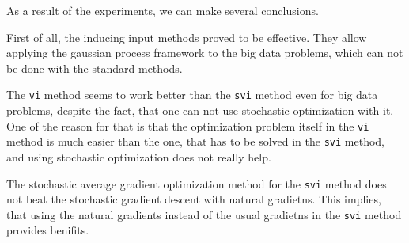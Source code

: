 As a result of the experiments, we can make several conclusions.

First of all, the inducing input methods proved to be effective. They allow applying the gaussian process framework to the big data problems, which can not be done with the standard methods. 

The \lstinline{vi} method seems to work better than the \lstinline{svi} method even for big data problems, despite the fact, that one can not use stochastic optimization with it. One of the reason for that is that the optimization problem itself in the \lstinline{vi} method is much easier than the one, that has to be solved in the \lstinline{svi} method, and using stochastic optimization does not really help.

The stochastic average gradient optimization method for the \lstinline{svi} method does not beat the stochastic gradient descent with natural gradietns. This implies, that using the natural gradients instead of the usual gradietns in the \lstinline{svi} method provides benifits.